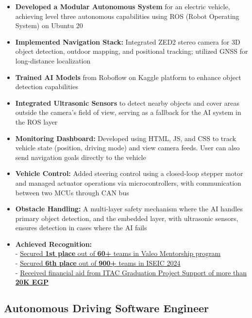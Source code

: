\begin{itemize}
	\item \textbf{Developed a Modular Autonomous System} for an electric vehicle, achieving level three autonomous capabilities using ROS (Robot Operating System) on Ubuntu 20
	\item \textbf{Implemented Navigation Stack:} Integrated ZED2 stereo camera for 3D object detection, outdoor mapping, and positional tracking; utilized GNSS for long-distance localization
	\item \textbf{Trained AI Models} from Roboflow on Kaggle platform to enhance object detection capabilities
	\item \textbf{Integrated Ultrasonic Sensors} to detect nearby objects and cover areas outside the camera's field of view, serving as a fallback for the AI system in the ROS layer
	\item \textbf{Monitoring Dashboard:} Developed using HTML, JS, and CSS to track vehicle state (position, driving mode) and view camera feeds. User can also send navigation goals directly to the vehicle
	\item \textbf{Vehicle Control:} Added steering control using a closed-loop stepper motor and managed actuator operations via microcontrollers, with communication between two MCUs through CAN bus
	\item \textbf{Obstacle Handling:} A multi-layer safety mechanism where the AI handles primary object detection, and the embedded layer, with ultrasonic sensors, ensures detection in cases where the AI fails
	\item \textbf{Achieved Recognition:}\\
		- \href{https://www.linkedin.com/posts/mohsen-m_vsignersegypt-wearevsigners-activity-7230237292680933376-fMSu/}{Secured \textbf{1st place} out of \textbf{60+} teams in Valeo Mentorship program}\\
		- \href{https://www.linkedin.com/posts/mohsen-m_i-am-happy-to-share-that-our-graduation-project-activity-7234299090778353665-MSd-/}{Secured \textbf{6th place} out of \textbf{900+} teams in ISEIC 2024}\\
		- \href{https://itida.gov.eg/English/Programs/Graduation/Documents/List-of-Accepted-Graduation-Projects-Round-19-new.pdf}{Received financial aid from ITAC Graduation Project Support of more than \textbf{20K EGP}}
\end{itemize}
%
%
%
%
\subsection*{
	Autonomous Driving Software Engineer 
	\hspace*{\fill}
}

